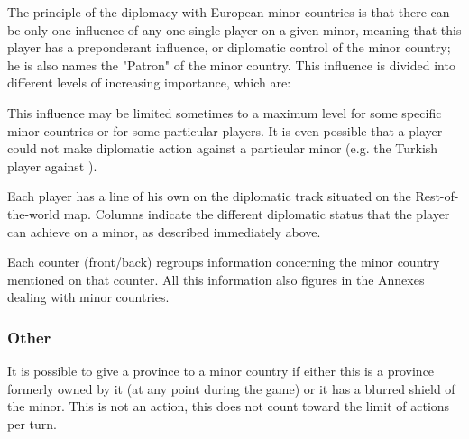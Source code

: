 The principle of the diplomacy with European minor countries is that there can
be only one influence of any one single player on a given minor, meaning that
this player has a preponderant influence, or diplomatic control of the minor
country; he is also names the "Patron" of the minor country. This influence is
divided into different levels of increasing importance, which are:
\begin{deflist}
    
   
\end{deflist}

\aparag[Limit]
This influence may be limited sometimes to a maximum level for some specific
minor countries or for some particular players. It is even possible that a
player could not make diplomatic action against a particular minor (e.g. the
Turkish player against \paysPerse).

Each player has a line of his own on the diplomatic track situated on the
Rest-of-the-world map. Columns indicate the different diplomatic status that
the player can achieve on a minor, as described immediately above.

Each counter (front/back) regroups information concerning the minor country
mentioned on that counter.  All this information also figures in the Annexes
dealing with minor countries.

\subsubsection{Other}
\aparag It is possible to give a province to a minor country if either this is
a province formerly owned by it (at any point during the game) or it has a
blurred shield of the minor.
\bparag This is not an action, this does not count toward the limit of actions
per turn.

